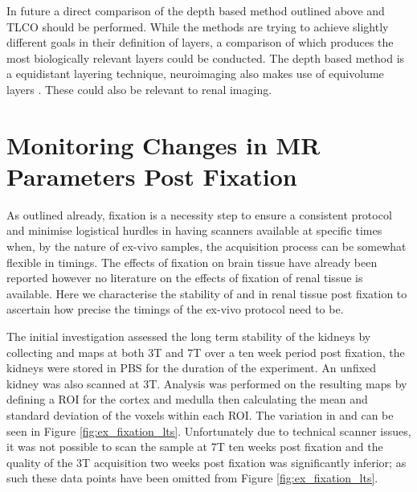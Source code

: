 In future a direct comparison of the depth based method outlined above and \ac{TLCO} should be performed. While the methods are trying to achieve slightly different goals in their definition of layers, a comparison of which produces the most biologically relevant layers could be conducted. The depth based method is a equidistant layering technique, neuroimaging also makes use of equivolume layers . These could also be relevant to renal imaging.

\section{Monitoring Changes in MR Parameters Post Fixation}
\label{sec:ex_tissue_fixation}
As outlined already, fixation is a necessity step to ensure a consistent protocol and minimise logistical hurdles in having scanners available at specific times when, by the nature of ex-vivo samples, the acquisition process can be somewhat flexible in timings. The effects of fixation on brain tissue have already been reported \cite{birkl_effects_2016, schmierer_quantitative_2008, shatil_quantitative_2018} however no literature on the effects of fixation of renal tissue is available. Here we characterise the stability of \tone and \ttwostar in renal tissue post fixation to ascertain how precise the timings of the ex-vivo protocol need to be.

The initial investigation assessed the long term stability of the kidneys by collecting \tone and \ttwostar maps at both 3T and 7T over a ten week period post fixation, the kidneys were stored in \ac{PBS} for the duration of the experiment. An unfixed kidney was also scanned at 3T. Analysis was performed on the resulting maps by defining a \ac{ROI} for the cortex and medulla then calculating the mean and standard deviation of the voxels within each \ac{ROI}. The variation in \tone and \ttwostar can be seen in Figure \ref{fig:ex_fixation_lts}. Unfortunately due to technical scanner issues, it was not possible to scan the sample at 7T ten weeks post fixation and the quality of the 3T \tone acquisition two weeks post fixation was significantly inferior; as such these data points have been omitted from Figure \ref{fig:ex_fixation_lts}.

